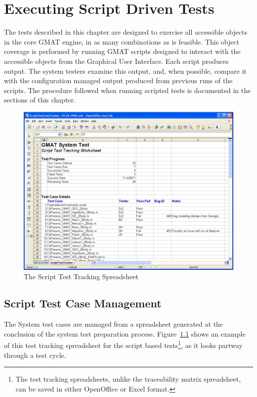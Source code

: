 \chapter{\label{chap:scripttests}Executing Script Driven Tests}

The tests described in this chapter are designed to exercise all accessible objects in the core
GMAT engine, in as many combinations as is feasible.  This object coverage is performed by running
GMAT scripts designed to interact with the accessible objects from the Graphical User Interface.
Each script produces output.  The system testers examine this output, and, when possible, compare it
with the configuration managed output produced from previous runs of the scripts.  The procedure
followed when running scripted tests is documented in the sections of this chapter.

\begin{figure}[htb]
\begin{center}
\includegraphics[460,346]{Images/TestTrackingWorksheet.png}
\caption{\label{figure:ScriptTestTracker2}The Script Test Tracking Spreadsheet}
\end{center}
\end{figure}

\section{Script Test Case Management}

The System test cases are managed from a spreadsheet generated at the conclusion of the system test
preparation process.  Figure~\ref{figure:ScriptTestTracker2} shows an example of this test
tracking spreadsheet for the script based tests\footnote{The test tracking spreadsheets, unlike the traceability matrix spreadsheet, can be saved in either OpenOffice or Excel format.}, as it looks
partway through a test cycle.

